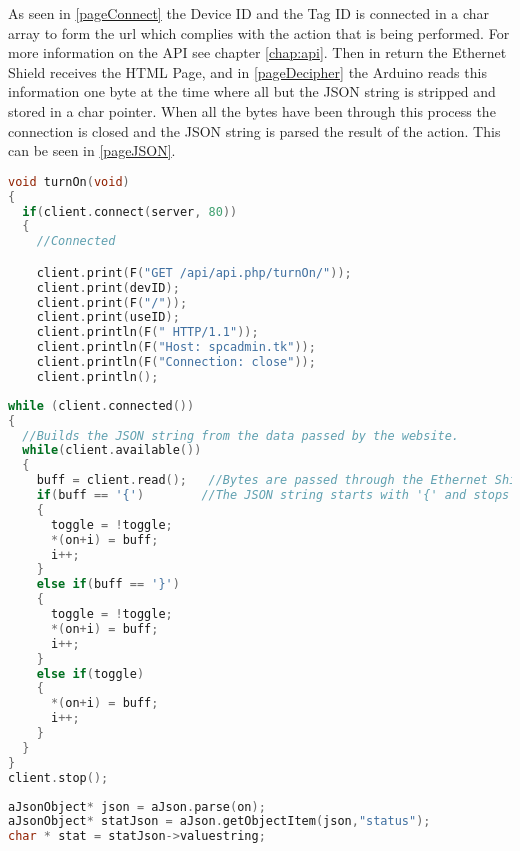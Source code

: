 As seen in \autoref{pageConnect} the Device ID and the Tag ID is connected in a char array to form the url which complies with the action that is being performed. For more information on the API see chapter \vref{chap:api}.
Then in return the Ethernet Shield receives the HTML Page, and in \autoref{pageDecipher} the Arduino reads this information one byte at the time where all but the JSON string is stripped and stored in a char pointer.
When all the bytes have been through this process the connection is closed and the JSON string is parsed the result of the action. This can be seen in \autoref{pageJSON}.
\begin{lstlisting}[frame=single, language=C, label=pageConnect, caption=Connecting to the Server and creating an HTML request.]
void turnOn(void)
{
  if(client.connect(server, 80))
  {
    //Connected

    client.print(F("GET /api/api.php/turnOn/"));
    client.print(devID);
    client.print(F("/"));
    client.print(useID);
    client.println(F(" HTTP/1.1"));
    client.println(F("Host: spcadmin.tk"));
    client.println(F("Connection: close"));
    client.println();
\end{lstlisting}

\begin{lstlisting}[frame=single, language=C, label=pageDecipher, caption=Removing all but the important information from the website.]
while (client.connected())
{
  //Builds the JSON string from the data passed by the website.
  while(client.available()) 
  { 
    buff = client.read();   //Bytes are passed through the Ethernet Shield with client.Read();
    if(buff == '{')        //The JSON string starts with '{' and stops with '}'.
    {
      toggle = !toggle;
      *(on+i) = buff;
      i++;
    }
    else if(buff == '}')
    {
      toggle = !toggle;
      *(on+i) = buff;
      i++;
    }
    else if(toggle)
    {
      *(on+i) = buff;
      i++;
    }
  }
}
client.stop();
\end{lstlisting}

\begin{lstlisting}[frame=single, language=C, label=pageJSON, caption=The JSON Code Getting a value with a Token.]
aJsonObject* json = aJson.parse(on);
aJsonObject* statJson = aJson.getObjectItem(json,"status");
char * stat = statJson->valuestring;
\end{lstlisting}